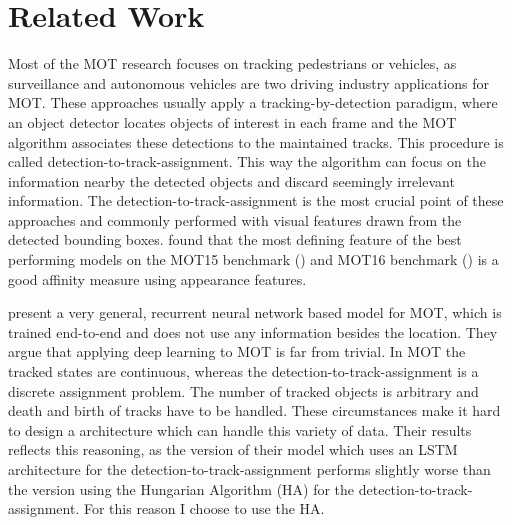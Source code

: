 \documentclass[12pt,a4paper]{article}
\begin{document}






\section{Related Work}
\label{related_work}

Most of the MOT research focuses on tracking pedestrians or vehicles, as surveillance and autonomous vehicles are two driving industry applications for MOT. These approaches usually apply a tracking-by-detection paradigm, where an object detector locates objects of interest in each frame and the MOT algorithm associates these detections to the maintained tracks. This procedure is called detection-to-track-assignment. This way the algorithm can focus on the information nearby the detected objects and discard seemingly irrelevant information. The detection-to-track-assignment is the most crucial point of these approaches and commonly performed with visual features drawn from the detected bounding boxes. \cite{tracking_the_trackers} found  that the most defining feature of the best performing models on the MOT15 benchmark (\cite{MOT15}) and MOT16 benchmark (\cite{MOT16}) is a good affinity measure using appearance features.


\cite{milan_rnn_tracking} present a very general, recurrent neural network based model for MOT, which is trained end-to-end and does not use any information besides the location. They argue that applying deep learning to MOT is far from trivial. In MOT the tracked states are continuous, whereas the detection-to-track-assignment is a discrete assignment problem. The number of tracked objects is arbitrary and death and birth of tracks have to be handled. These circumstances make it hard to design a architecture which can handle this variety of data. Their results reflects this reasoning, as the version of their model which uses an LSTM architecture for the detection-to-track-assignment performs slightly worse than the version using the Hungarian Algorithm (HA) for the detection-to-track-assignment. For this reason I choose to use the HA.
\end{document}
